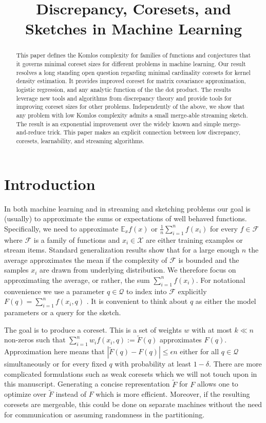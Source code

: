 \documentclass[anon,12pt]{colt2019} %
\title[Discrepancy, Coresets, and Sketches in Machine Learning]{Discrepancy, Coresets, and Sketches in Machine Learning}
\newcommand{\E}{\mathbb{E}}
\newcommand{\eps}{\epsilon}
\newcommand{\F}{\mathcal{F}}
\begin{document}
\maketitle

\begin{abstract}
This paper defines the Komlos complexity for families of functions and conjectures that it governs minimal coreset sizes for different problems in machine learning. Our result resolves a long standing open question regarding minimal cardinality coresets for kernel density estimation. It provides improved coreset for matrix covariance approximation, logistic regression, and any analytic function of the the dot product. The results leverage new tools and algorithms from discrepancy theory and provide tools for improving coreset sizes for other problems. Independently of the above, we show that any problem with low Komlos complexity admits a small merge-able streaming sketch. 
The result is an exponential improvement over the widely known and simple merge-and-reduce trick.
This paper makes an explicit connection between low discrepancy, coresets, learnability, and streaming algorithms. 
\end{abstract}


\section{Introduction}
In both machine learning and in streaming and sketching problems our goal is (usually) to approximate the sums or expectations of well behaved functions.
Specifically, we need to approximate $\E_x f(x)$ or $\frac{1}{n}\sum_{i=1}^{n} f(x_i)$ for every $f\in \F$ where $\F$ is a family of functions and $x_i \in \mathcal X$ are either training examples or stream items. 
Standard generalization results show that for a large enough $n$ the average approximates the mean if the complexity of $\F$ is bounded and the samples $x_i$ are drawn from underlying distribution. We therefore focus on approximating the average, or rather, the sum $\sum_{i=1}^{n} f(x_i)$. For notational convenience we use a parameter $q \in \mathcal Q$ to index into $\F$ explicitly $F(q) = \sum_{i=1}^{n} f(x_i, q)$ . It is convenient to think about $q$ as either the model parameters or a query for the sketch. 

The goal is to produce a coreset. This is a set of weights $w$ with at most $k \ll n$ non-zeros such that $\sum_{i=1}^{n}w_i f(x_i,q) := \tilde F(q)$ approximates $F(q)$.
Approximation here means that $|\tilde F(q)  - F(q)| \le \eps n$ either for all $q \in \mathcal Q$ simultaneously or for every fixed $q$ with probability at least $1-\delta$. 
There are more complicated formulations such as weak coresets which we will not touch upon in this manuscript. 
Generating a concise representation $\tilde F$ for $F$ allows one to optimize over $\tilde F$ instead of $F$ which is more efficient.  Moreover, if the resulting coresets are mergeable, this could be done on separate machines without the need for communication or assuming randomness in the partitioning.
\end{document}
